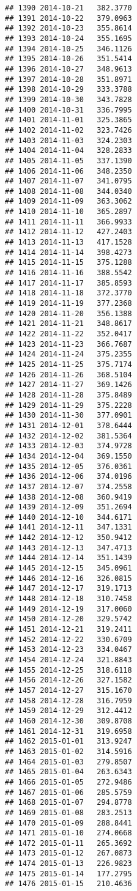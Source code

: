 \documentclass[
]{article}
\begin{document}
\begin{verbatim}
## 1390 2014-10-21   382.3770
## 1391 2014-10-22   379.0963
## 1392 2014-10-23   355.8614
## 1393 2014-10-24   355.1695
## 1394 2014-10-25   346.1126
## 1395 2014-10-26   351.5414
## 1396 2014-10-27   348.9613
## 1397 2014-10-28   351.8971
## 1398 2014-10-29   333.3788
## 1399 2014-10-30   343.7828
## 1400 2014-10-31   336.7995
## 1401 2014-11-01   325.3865
## 1402 2014-11-02   323.7426
## 1403 2014-11-03   324.2303
## 1404 2014-11-04   328.2833
## 1405 2014-11-05   337.1390
## 1406 2014-11-06   348.2350
## 1407 2014-11-07   341.0795
## 1408 2014-11-08   344.0340
## 1409 2014-11-09   363.3062
## 1410 2014-11-10   365.2897
## 1411 2014-11-11   366.9933
## 1412 2014-11-12   427.2403
## 1413 2014-11-13   417.1528
## 1414 2014-11-14   398.4273
## 1415 2014-11-15   375.1288
## 1416 2014-11-16   388.5542
## 1417 2014-11-17   385.8593
## 1418 2014-11-18   372.3770
## 1419 2014-11-19   377.2368
## 1420 2014-11-20   356.1388
## 1421 2014-11-21   348.8617
## 1422 2014-11-22   352.0417
## 1423 2014-11-23   366.7687
## 1424 2014-11-24   375.2355
## 1425 2014-11-25   375.7174
## 1426 2014-11-26   368.5104
## 1427 2014-11-27   369.1426
## 1428 2014-11-28   375.8489
## 1429 2014-11-29   375.2228
## 1430 2014-11-30   377.0901
## 1431 2014-12-01   378.6444
## 1432 2014-12-02   381.5364
## 1433 2014-12-03   374.9728
## 1434 2014-12-04   369.1550
## 1435 2014-12-05   376.0361
## 1436 2014-12-06   374.0196
## 1437 2014-12-07   374.2558
## 1438 2014-12-08   360.9419
## 1439 2014-12-09   351.2694
## 1440 2014-12-10   344.6171
## 1441 2014-12-11   347.1331
## 1442 2014-12-12   350.9412
## 1443 2014-12-13   347.4713
## 1444 2014-12-14   351.1439
## 1445 2014-12-15   345.0961
## 1446 2014-12-16   326.0815
## 1447 2014-12-17   319.1713
## 1448 2014-12-18   310.7458
## 1449 2014-12-19   317.0060
## 1450 2014-12-20   329.5742
## 1451 2014-12-21   319.2411
## 1452 2014-12-22   330.6709
## 1453 2014-12-23   334.0467
## 1454 2014-12-24   321.8843
## 1455 2014-12-25   318.6118
## 1456 2014-12-26   327.1582
## 1457 2014-12-27   315.1670
## 1458 2014-12-28   316.7959
## 1459 2014-12-29   312.4412
## 1460 2014-12-30   309.8708
## 1461 2014-12-31   319.6958
## 1462 2015-01-01   313.9247
## 1463 2015-01-02   314.5916
## 1464 2015-01-03   279.8507
## 1465 2015-01-04   263.6343
## 1466 2015-01-05   272.9486
## 1467 2015-01-06   285.5759
## 1468 2015-01-07   294.8778
## 1469 2015-01-08   283.2513
## 1470 2015-01-09   288.8441
## 1471 2015-01-10   274.0668
## 1472 2015-01-11   265.3692
## 1473 2015-01-12   267.0873
## 1474 2015-01-13   226.9823
## 1475 2015-01-14   177.2795
## 1476 2015-01-15   210.4636

\end{verbatim}
\end{document}

